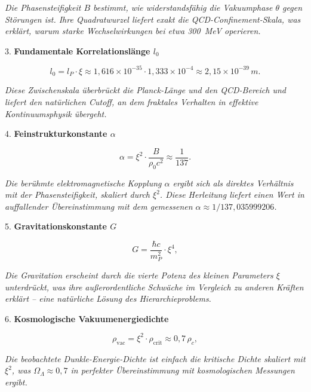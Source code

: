 	\textit{Die Phasensteifigkeit \(B\) bestimmt, wie widerstandsfähig die Vakuumphase \(\theta\) gegen Störungen ist. Ihre Quadratwurzel liefert exakt die QCD-Confinement-Skala, was erklärt, warum starke Wechselwirkungen bei etwa 300~MeV operieren.}
	
	3. \textbf{Fundamentale Korrelationslänge \(l_0\)}
	
	\begin{equation}
		l_0 = l_P \cdot \xi \approx 1{,}616 \times 10^{-35} \cdot 1{,}333 \times 10^{-4} \approx 2{,}15 \times 10^{-39}\,\si{m}.
	\end{equation}
	
	\textit{Diese Zwischenskala überbrückt die Planck-Länge und den QCD-Bereich und liefert den natürlichen Cutoff, an dem fraktales Verhalten in effektive Kontinuumsphysik übergeht.}
	
	4. \textbf{Feinstrukturkonstante \(\alpha\)}
	
	\begin{equation}
		\alpha = \xi^2 \cdot \frac{B}{\rho_0 c^2} \approx \frac{1}{137}.
	\end{equation}
	
	\textit{Die berühmte elektromagnetische Kopplung \(\alpha\) ergibt sich als direktes Verhältnis mit der Phasensteifigkeit, skaliert durch \(\xi^2\). Diese Herleitung liefert einen Wert in auffallender Übereinstimmung mit dem gemessenen \(\alpha \approx 1/137{,}035999206\).}
	
	5. \textbf{Gravitationskonstante \(G\)}
	
	\begin{equation}
		G = \frac{\hbar c}{m_P^2} \cdot \xi^4,
	\end{equation}
	
	\textit{Die Gravitation erscheint durch die vierte Potenz des kleinen Parameters \(\xi\) unterdrückt, was ihre außerordentliche Schwäche im Vergleich zu anderen Kräften erklärt – eine natürliche Lösung des Hierarchieproblems.}
	
	6. \textbf{Kosmologische Vakuumenergiedichte}
	
	\begin{equation}
		\rho_{\text{vac}} = \xi^2 \cdot \rho_{\text{crit}} \approx 0{,}7\, \rho_c,
	\end{equation}
	
	\textit{Die beobachtete Dunkle-Energie-Dichte ist einfach die kritische Dichte skaliert mit \(\xi^2\), was \(\Omega_\Lambda \approx 0{,}7\) in perfekter Übereinstimmung mit kosmologischen Messungen ergibt.}
	
